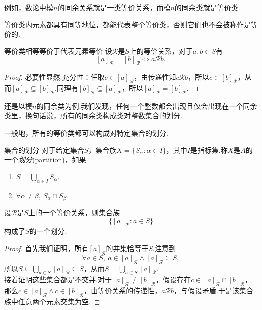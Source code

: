 例如，数论中模$n$的同余关系就是一类等价关系，而模$n$的同余类就是等价类.

等价类内元素都具有同等地位，都能代表整个等价类，否则它们也不会被称作是等价的.

\begin{proposition}{等价类相等等价于代表元素等价}
	设$\mathcal{R}$是$S$上的等价关系，对于$a,b \in S$有$$[a]_{\mathcal{R}} = [b]_{\mathcal{R}} \Leftrightarrow a\mathcal{R} b.$$
\end{proposition}
\begin{proof}
	必要性显然.充分性：任取$c \in [a]_{\mathcal{R}}$，由传递性知$c \mathcal{R} b$，所以$c \in [b]_{\mathcal{R}}$，从而$[a]_{\mathcal{R}} \subseteq [b]_{\mathcal{R}}$.同理有$[b]_{\mathcal{R}} \subseteq [a]_{\mathcal{R}}$，所以$[a]_{\mathcal{R}} = [b]_{\mathcal{R}}$.
\end{proof}

还是以模$n$的同余类为例.我们发现，任何一个整数都会出现且仅会出现在一个同余类里，换句话说，所有的同余类构成类对整数集合的划分.

一般地，所有的等价类都可以构成对特定集合的划分.

\begin{definition}{集合的划分}
	对于给定集合$S$，集合族$X=\{ S_{\alpha} : \alpha \in I \}$，其中$I$是指标集.称$X$是$A$的一个\textit{划分}(partition)，如果
	\begin{enumerate}
		\item $S = \bigcup_{\alpha \in I} S_{\alpha}$.
		\item $\forall \alpha \neq \beta ,~S_{\alpha} \cap S_{\beta}$.
	\end{enumerate}
\end{definition}

\begin{theorem}
	设$\mathcal{R}$是$S$上的一个等价关系，则集合族$$\{ [a]_{\mathcal{R}}:a \in S \}$$构成了$S$的一个划分.
\end{theorem}
\begin{proof}
	首先我们证明，所有$[a]_{\mathcal{R}}$的并集恰等于$S$.注意到$$\forall a \in S,~a \in [a]_{\mathcal{R}} \wedge [a]_{\mathcal{R}} \subseteq S,$$
	所以$S \subseteq \bigcup_{a \in S} [a]_{\mathcal{R}} \subseteq S$，从而$S = \bigcup_{a \in S} [a]_{\mathcal{R}}$. \\
	接着证明这些集合都是不交并.对于$[a]_{\mathcal{R}} \neq [b]_{\mathcal{R}}$，假设存在$c \in [a]_{\mathcal{R}} \cap [b]_{\mathcal{R}}$，那么$c \in [a]_{\mathcal{R}} \wedge c \in [b]_{\mathcal{R}}$，由等价关系的传递性，$a\mathcal{R}b$，与假设矛盾.于是该集合族中任意两个元素交集为空.
\end{proof}

